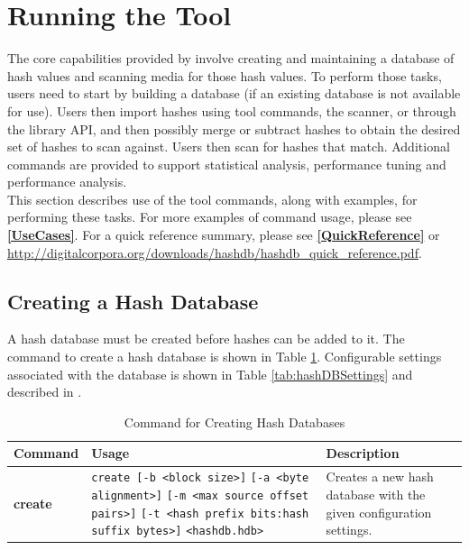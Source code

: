 \documentclass[11pt,fleqn]{article} %
\begin{document}
\section {Running the \hdb Tool}
\label{Running}
The core capabilities provided by \hdb involve creating and maintaining a database of hash values and scanning media for those hash values. To perform those tasks, \hdb users need to start by building a database (if an existing database is not available for use).
Users then import hashes using \hdb tool commands, the \hdb \bulk scanner, or through the \hdb library API, and then possibly merge or subtract hashes to obtain the desired set of hashes to scan against.
Users then scan for hashes that match.
Additional commands are provided to support statistical analysis, performance tuning and performance analysis.\\

This section describes use of the \hdb tool commands, along with examples, for performing these tasks.
For more examples of command usage, please see \textbf{\autoref{UseCases}}.
For a \hdb quick reference summary, please see \textbf{\autoref{QuickReference}}
or \url{http://digitalcorpora.org/downloads/hashdb/hashdb_quick_reference.pdf}.

\subsection{Creating a Hash Database}
\label{Creating}
A hash database must be created before hashes can be added to it.
The command to create a hash database is shown in Table \ref{tab:createDatabase}.
Configurable settings associated with the database is shown in Table \ref{tab:hashDBSettings} and described in \textbf{}.\\
\begin{table}[!ht]
\centering
\caption{Command for Creating Hash Databases}
\label{tab:createDatabase}
\begin{tabular}{|p{2.5 cm}|p{7 cm}|p{4 cm}|}
\hline \hline
\textbf{Command} & \textbf{Usage} & \textbf{Description} \\
\hline
\textbf{create} & \verb+create [-b <block size>]+ \verb+[-a <byte alignment>]+ \verb+[-m <max source offset pairs>]+ \verb+[-t <hash prefix bits:hash+ \verb+suffix bytes>]+ \verb+<hashdb.hdb>+ & Creates a new hash database with the given configuration settings.\\
\hline
\end{tabular}
\end{table}
\end{document}
